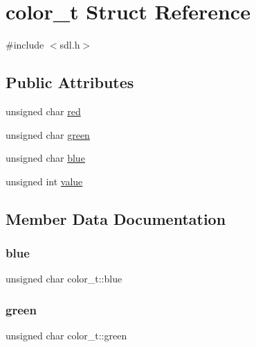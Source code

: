 \hypertarget{structcolor__t}{}\section{color\+\_\+t Struct Reference}
\label{structcolor__t}


{\ttfamily \#include $<$sdl.\+h$>$}

\subsection*{Public Attributes}
\begin{DoxyCompactItemize}
\item 
unsigned char \hyperlink{structcolor__t_ac498f95c1c5217d2033d5bbcb689f0c3}{red}
\item 
unsigned char \hyperlink{structcolor__t_a85e1636e41c5772cf432e4612ed00310}{green}
\item 
unsigned char \hyperlink{structcolor__t_ae7b396dd4ef019a28101fffe17ac33af}{blue}
\item 
unsigned int \hyperlink{structcolor__t_ae346ea49d8896a5233739803fdc1671c}{value}
\end{DoxyCompactItemize}


\subsection{Member Data Documentation}
\mbox{\label{structcolor__t_ae7b396dd4ef019a28101fffe17ac33af}} 
\subsubsection{\texorpdfstring{blue}{blue}}
{\footnotesize\ttfamily unsigned char color\+\_\+t\+::blue}

\mbox{\label{structcolor__t_a85e1636e41c5772cf432e4612ed00310}} 
\subsubsection{\texorpdfstring{green}{green}}
{\footnotesize\ttfamily unsigned char color\+\_\+t\+::green}

\mbox{\label{structcolor__t_ac498f95c1c5217d2033d5bbcb689f0c3}} 
